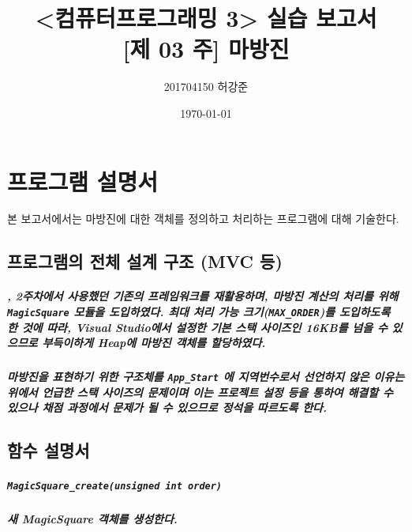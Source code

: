 \documentclass[UTF8]{report}
\title{%
    <컴퓨터프로그래밍 3> 실습 보고서 \\ 
    \large [제 03 주] 마방진}
\author{201704150 허강준}
\date{\today}
\begin{document}
    \maketitle
    \tableofcontents

    \chapter{프로그램 설명서}
        본 보고서에서는 마방진에 대한 객체를 정의하고 처리하는 프로그램에 대해 기술한다.

        \section{프로그램의 전체 설계 구조 (MVC 등)}
            
            \paragraph{%
                , 2주차에서 사용했던 기존의 프레임워크를 재활용하며, 마방진 계산의 처리를 위해 \texttt{MagicSquare} 모듈을 도입하였다. 최대 처리 가능 크기(\texttt{MAX\_ORDER})를 도입하도록 한 것에 따라, Visual Studio에서 설정한 기본 스택 사이즈인 16KB를 넘을 수 있으므로 부득이하게 Heap에 마방진 객체를 할당하였다.
            }

            \paragraph{%
                \normalfont 마방진을 표현하기 위한 구조체를 \texttt{App\_Start} 에 지역번수로서 선언하지 않은 이유는 위에서 언급한 스택 사이즈의 문제이며 이는 프로젝트 설정 등을 통하여 해결할 수 있으나 채점 과정에서 문제가 될 수 있으므로 정석을 따르도록 한다.
            }
            
        \section{함수 설명서}

            \paragraph{\texttt{MagicSquare\_create(unsigned int order)}}
            \paragraph{%
                \normalfont 새 MagicSquare 객체를 생성한다.
            }
\end{document}
